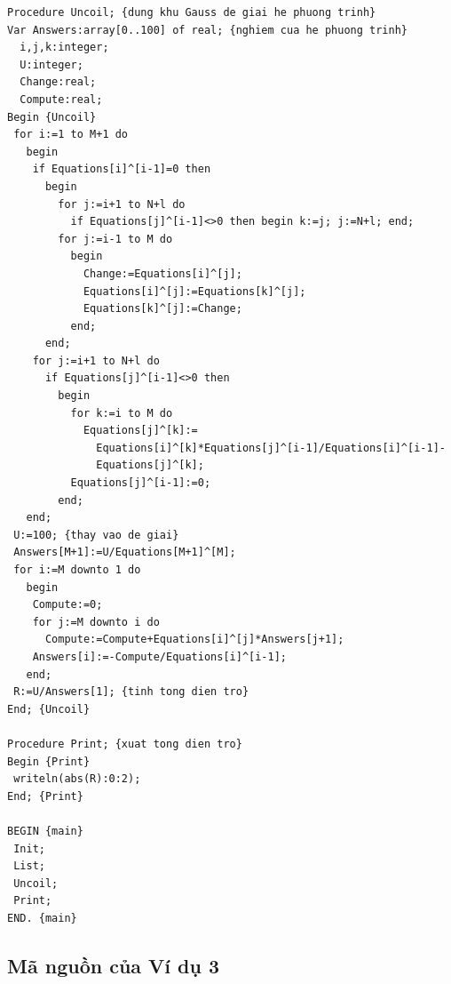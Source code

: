 \documentclass[11pt]{article}
\begin{document}
\begin{verbatim}
Procedure Uncoil; {dung khu Gauss de giai he phuong trinh}
Var Answers:array[0..100] of real; {nghiem cua he phuong trinh}
  i,j,k:integer;
  U:integer;
  Change:real;
  Compute:real;
Begin {Uncoil}
 for i:=1 to M+1 do
   begin
    if Equations[i]^[i-1]=0 then
      begin
        for j:=i+1 to N+l do
          if Equations[j]^[i-1]<>0 then begin k:=j; j:=N+l; end;
        for j:=i-1 to M do
          begin
            Change:=Equations[i]^[j];
            Equations[i]^[j]:=Equations[k]^[j];
            Equations[k]^[j]:=Change;
          end;
      end;
    for j:=i+1 to N+l do
      if Equations[j]^[i-1]<>0 then
        begin
          for k:=i to M do
            Equations[j]^[k]:=
              Equations[i]^[k]*Equations[j]^[i-1]/Equations[i]^[i-1]-
              Equations[j]^[k];
          Equations[j]^[i-1]:=0;
        end;
   end;
 U:=100; {thay vao de giai}
 Answers[M+1]:=U/Equations[M+1]^[M];
 for i:=M downto 1 do
   begin
    Compute:=0;
    for j:=M downto i do
      Compute:=Compute+Equations[i]^[j]*Answers[j+1];
    Answers[i]:=-Compute/Equations[i]^[i-1];
   end;
 R:=U/Answers[1]; {tinh tong dien tro}
End; {Uncoil}

Procedure Print; {xuat tong dien tro}
Begin {Print}
 writeln(abs(R):0:2);
End; {Print}

BEGIN {main}
 Init;
 List;
 Uncoil;
 Print;
END. {main}
\end{verbatim}
\endgroup

\subsection{Mã nguồn của Ví dụ 3}
\end{document}
